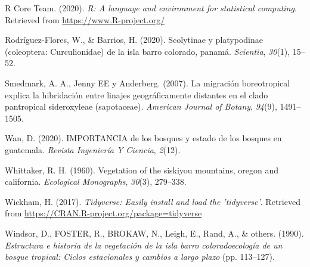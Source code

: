 \documentclass[11pt,]{article}
\begin{document}
\hypertarget{ref-Restudio}{}
R Core Team. (2020). \emph{R: A language and environment for statistical
computing}. Retrieved from \url{https://www.R-project.org/}

\hypertarget{ref-rodriguez2020scolytinae}{}
Rodríguez-Flores, W., \& Barrios, H. (2020). Scolytinae y platypodinae
(coleoptera: Curculionidae) de la isla barro colorado, panamá.
\emph{Scientia}, \emph{30}(1), 15--52.

\hypertarget{ref-smedmark2007boreotropical}{}
Smedmark, A. A., Jenny EE y Anderberg. (2007). La migración
boreotropical explica la hibridación entre linajes geográficamente
distantes en el clado pantropical sideroxyleae (sapotaceae).
\emph{American Journal of Botany}, \emph{94}(9), 1491--1505.

\hypertarget{ref-wan2020importancia}{}
Wan, D. (2020). IMPORTANCIA de los bosques y estado de los bosques en
guatemala. \emph{Revista Ingeniería Y Ciencia}, \emph{2}(12).

\hypertarget{ref-whittaker1960vegetation}{}
Whittaker, R. H. (1960). Vegetation of the siskiyou mountains, oregon
and california. \emph{Ecological Monographs}, \emph{30}(3), 279--338.

\hypertarget{ref-tidyverse}{}
Wickham, H. (2017). \emph{Tidyverse: Easily install and load the
'tidyverse'}. Retrieved from
\url{https://CRAN.R-project.org/package=tidyverse}

\hypertarget{ref-windsorestructura}{}
Windsor, D., FOSTER, R., BROKAW, N., Leigh, E., Rand, A., \& others.
(1990). \emph{Estructura e historia de la vegetación de la isla barro
coloradoecología de un bosque tropical: Ciclos estacionales y cambios a
largo plazo} (pp. 113--127).




\newpage
\singlespacing 
\end{document}
